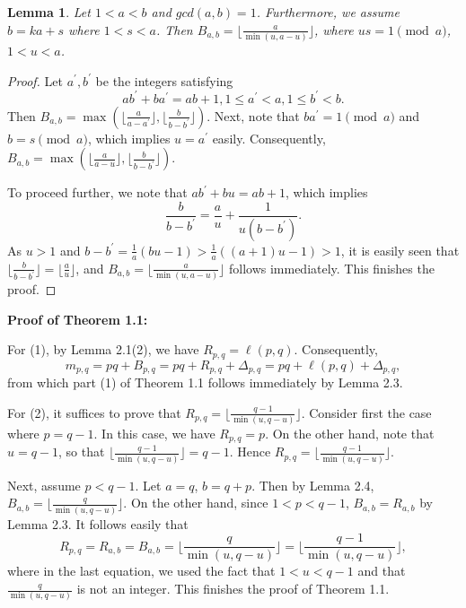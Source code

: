 \documentclass[11pt]{amsart}
\theoremstyle{plain}
\numberwithin{theorem}{section}
\newtheorem{lemma}[theorem]{Lemma}
\theoremstyle{definition}
\begin{document}
\begin{lemma}
Let $1<a<b$ and $gcd(a,b)=1$. Furthermore, we assume $b=ka+s$ where $1<s<a$. Then
$B_{a,b}=\lfloor \frac{a}{\min (u,a-u)}\rfloor$, where $us=1 \pmod{a}$, $1<u<a$. 
\end{lemma}

\begin{proof}
Let $a^\prime,b^\prime$ be the integers satisfying
$$
ab^\prime+ba^\prime=ab+1, 1\leq a^\prime<a, 1\leq b^\prime<b.
$$
Then $B_{a,b}=\max (\lfloor \frac{a}{a-a^\prime}\rfloor , \lfloor \frac{b}{b-b^\prime}\rfloor)$. Next, note that $ba^\prime=1 \pmod{a}$ and $b=s \pmod{a}$, which implies $u=a^\prime$ easily. 
Consequently, $B_{a,b}=\max (\lfloor \frac{a}{a-u}\rfloor , \lfloor \frac{b}{b-b^\prime}\rfloor)$. 

To proceed further, we note that $ab^\prime+bu=ab+1$, which implies 
$$
\frac{b}{b-b^\prime}=\frac{a}{u}+\frac{1}{u(b-b^\prime)}.
$$
As $u>1$ and $b-b^\prime=\frac{1}{a}(bu-1)>\frac{1}{a}((a+1)u-1)>1$, it is easily seen that 
$\lfloor \frac{b}{b-b^\prime}\rfloor =\lfloor \frac{a}{u} \rfloor$,
and $B_{a,b}= \lfloor \frac{a}{\min (u,a-u)}\rfloor$ follows immediately. This finishes the proof. 

\end{proof}

{\bf Proof of Theorem 1.1:}

\vspace{2mm}

For (1), by Lemma 2.1(2), we have $R_{p,q}=\ell(p,q)$. Consequently, 
$$
m_{p,q}=pq+B_{p,q}=pq+ R_{p,q}+\Delta_{p,q}=pq+\ell(p,q)+\Delta_{p,q},
$$
from which part (1) of Theorem 1.1 follows immediately by Lemma 2.3.

For (2), it suffices to prove that $R_{p,q}=\lfloor \frac{q-1}{\min(u,q-u)} \rfloor$. Consider first the case
where $p=q-1$. In this case, we have $R_{p,q}=p$. On the other hand, note that $u=q-1$, so that
$\lfloor \frac{q-1}{\min(u,q-u)} \rfloor=q-1$.  Hence $R_{p,q}=\lfloor \frac{q-1}{\min(u,q-u)} \rfloor$. 

Next, assume $p<q-1$. Let $a=q$, $b=q+p$. Then by Lemma 2.4, 
$B_{a,b}=\lfloor \frac{q}{\min(u,q-u)} \rfloor$. On the other hand, since $1<p<q-1$, 
$B_{a,b}=R_{a,b}$ by Lemma 2.3. It follows easily that
$$
R_{p,q}=R_{a,b}=B_{a,b}=\lfloor \frac{q}{\min(u,q-u)} \rfloor=\lfloor \frac{q-1}{\min(u,q-u)} \rfloor,
$$
where in the last equation, we used the fact that $1<u<q-1$ and that $\frac{q}{\min(u,q-u)}$ is not an integer. This finishes the proof of Theorem 1.1.
\end{document}
